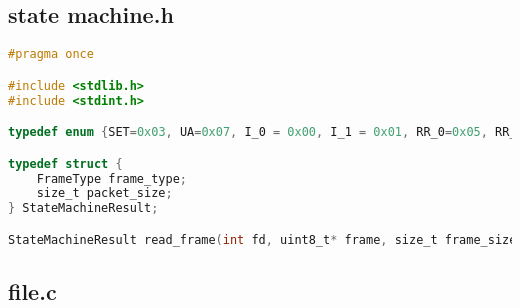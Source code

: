 \subsection{state \textunderscore machine.h}

\begin{lstlisting}[language=C, caption=state_machine.h]
#pragma once

#include <stdlib.h>
#include <stdint.h>

typedef enum {SET=0x03, UA=0x07, I_0 = 0x00, I_1 = 0x01, RR_0=0x05, RR_1=0x85, DISC=0x0D, ERROR, REJ_0=0x01, REJ_1=0x81, NONE} FrameType;

typedef struct {
    FrameType frame_type;
    size_t packet_size;
} StateMachineResult;

StateMachineResult read_frame(int fd, uint8_t* frame, size_t frame_size); 
\end{lstlisting}

\subsection{file.c}

